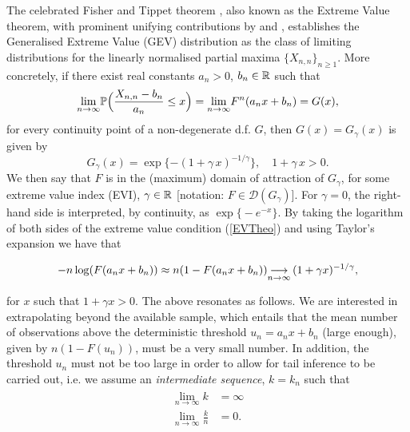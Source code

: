 The celebrated Fisher and Tippet theorem \citep{ft28}, also known as the Extreme Value theorem, with prominent unifying contributions by \cite{Gnedenko:43} and \cite{deHaan:70}, establishes the Generalised Extreme Value (GEV) distribution as the class of limiting distributions for the linearly normalised partial maxima $\{X_{n,n} \}_{n\geq 1}$. More concretely, if there exist real constants $a_n>0$, $b_n \in {\mathbb{R}}$ such that
\begin{equation}\label{EVTheo}
	\displaystyle {\lim_{n \rightarrow{\infty}}} \mathbb{P} \Bigl( \frac{X_{n,n}-b_n}{a_n} \leq x\Bigr)= \displaystyle {\lim_{n \rightarrow{\infty}}} F^n (a_n x + b_n) = G(x),
\end{equation}
for every continuity point of a non-degenerate d.f. $G$, then $G(x)= G_{\gamma}(x)$ is given by
\begin{equation}\label{GEVd}
	G_{\gamma}(x)= \exp \{ -(1+ \gamma\, x)^{-1/\gamma}\}, \quad 1+\gamma\,x >0.
\end{equation}
We then say that $F$ is in the (maximum) domain of attraction of $G_\gamma$,  for some extreme value index (EVI), $\gamma \in {\mathbb{R}}$ [notation: $F \in \mathcal{D}(G_{\gamma}) $]. For $\gamma=0$, the right-hand side is interpreted, by continuity, as $\exp\bigl\{-e^{-x}\bigr\}$. By taking the logarithm of both sides of the extreme value condition (\ref{EVTheo}) and using Taylor's expansion we have that 


\begin{equation}
-n\log(F(a_n x + b_n )) \approx n(1 - F(a_n x + b_n )) \displaystyle {\mathop {\longrightarrow}_{n \rightarrow \infty}\,} (1 + \gamma x )^{-1/\gamma},
\end{equation}

\noindent for $x$ such that $ 1 + \gamma x > 0 $. The above resonates as follows. We are interested in extrapolating beyond the available sample, which entails that the mean number of observations above the deterministic threshold $ u_n = a_n x + b_n$ (large enough), given by $ n( 1- F(u_n)) $, must be a very small number. In addition, the threshold $ u_n $ must not be too large in order to allow for tail inference to be carried out, i.e. we assume an \textit{intermediate sequence}, $ k = k_n $ such that %
\begin{align} \label{eq:k_cond}
\begin{split}
\lim_{n \rightarrow \infty} k &= \infty \\
\lim_{n \rightarrow \infty} \frac{k}{n} &= 0.
\end{split}
\end{align}

